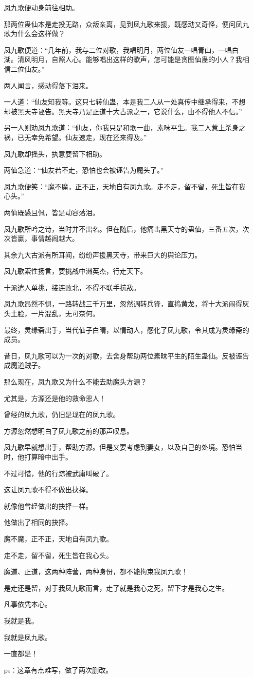 \begin{this_body}
凤九歌便动身前往相助。

那两位蛊仙本是走投无路，众叛亲离，见到凤九歌来援，既感动又奇怪，便问凤九歌为什么会这样做？

凤九歌便道：“几年前，我与二位对歌，我唱明月，两位仙友一唱青山，一唱白湖。清风明月，自照人心。能够唱出这样的歌声，怎可能是贪图仙蛊的小人？我相信二位仙友。”

两人闻言，感动得落下泪来。

一人道：“仙友知我等。这只七转仙蛊，本是我二人从一处真传中继承得来，不想却被黑天寺诬告。黑天寺乃是正道十大古派之一，它说什么，由不得他人不信。”

另一人则劝凤九歌道：“仙友，你我只是和歌一曲，素味平生。我二人惹上杀身之祸，已无幸免希望。仙友速走，现在还来得及。”

凤九歌却摇头，执意要留下相助。

两仙急道：“仙友若不走，恐怕也会被诬告为魔头了。”

凤九歌便笑：“魔不魔，正不正，天地自有凤九歌。走不走，留不留，死生皆在我心头。”

两仙既感且佩，皆是动容落泪。

凤九歌所吟之诗，当时并不出名。但在随后，他痛击黑天寺的蛊仙，三番五次，次次皆赢，事情越闹越大。

其余九大古派有所耳闻，纷纷声援黑天寺，带来巨大的舆论压力。

凤九歌索性扬言，要挑战中洲英杰，行走天下。

十派遣人单挑，接连败北，不得不联手抗敌。

凤九歌昂然不惧，一路转战三千万里，忽然调转兵锋，直捣黄龙，将十大派闹得灰头土脸，一片混乱，无可奈何。

最终，灵缘斋出手，当代仙子白晴，以情动人，感化了凤九歌，令其成为灵缘斋的成员。

昔日，凤九歌可以为一次的对歌，去舍身帮助两位素昧平生的陌生蛊仙。反被诬告成魔道贼子。

那么现在，凤九歌又为什么不能去助魔头方源？

尤其是，方源还是他的救命恩人！

曾经的凤九歌，仍旧是现在的凤九歌。

方源忽然想明白了凤九歌之前的那声叹息。

凤九歌早就想出手，帮助方源。但是又要考虑到妻女，以及自己的处境。恐怕当时，他打算暗中出手。

不过可惜，他的行踪被武庸叫破了。

这让凤九歌不得不做出抉择。

就像他曾经做出的抉择一样。

他做出了相同的抉择。

魔不魔，正不正，天地自有凤九歌。

走不走，留不留，死生皆在我心头。

魔道、正道，这两种阵营，两种身份，都不能拘束我凤九歌！

是走还是留，对于我凤九歌而言，走了就是我心之死，留下才是我心之生。

凡事依凭本心。

我就是我。

我就是凤九歌。

一直都是！

ps：这章有点难写，做了两次删改。

\end{this_body}

